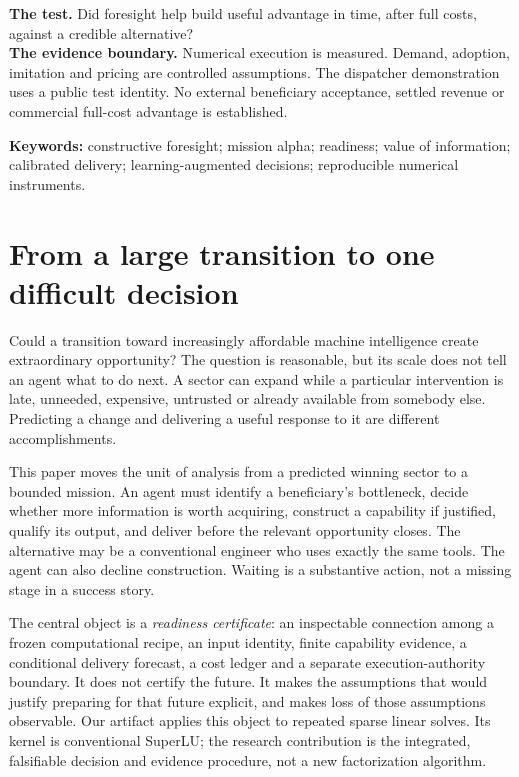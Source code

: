 \documentclass[11pt,a4paper]{article}
\begin{document}
\begin{claimbox}
\textbf{The test.} Did foresight help build useful advantage in time, after full costs, against a credible alternative?\\[3pt]
\textbf{The evidence boundary.} Numerical execution is measured. Demand, adoption, imitation and pricing are controlled assumptions. The dispatcher demonstration uses a public test identity. No external beneficiary acceptance, settled revenue or commercial full-cost advantage is established.
\end{claimbox}
\vspace{2mm}
\textbf{Keywords:} constructive foresight; mission alpha; readiness; value of information; calibrated delivery; learning-augmented decisions; reproducible numerical instruments.

\section{From a large transition to one difficult decision}
Could a transition toward increasingly affordable machine intelligence create extraordinary opportunity? The question is reasonable, but its scale does not tell an agent what to do next. A sector can expand while a particular intervention is late, unneeded, expensive, untrusted or already available from somebody else. Predicting a change and delivering a useful response to it are different accomplishments.

This paper moves the unit of analysis from a predicted winning sector to a bounded mission. An agent must identify a beneficiary's bottleneck, decide whether more information is worth acquiring, construct a capability if justified, qualify its output, and deliver before the relevant opportunity closes. The alternative may be a conventional engineer who uses exactly the same tools. The agent can also decline construction. Waiting is a substantive action, not a missing stage in a success story.

The central object is a \emph{readiness certificate}: an inspectable connection among a frozen computational recipe, an input identity, finite capability evidence, a conditional delivery forecast, a cost ledger and a separate execution-authority boundary. It does not certify the future. It makes the assumptions that would justify preparing for that future explicit, and makes loss of those assumptions observable. Our artifact applies this object to repeated sparse linear solves. Its kernel is conventional SuperLU; the research contribution is the integrated, falsifiable decision and evidence procedure, not a new factorization algorithm.
\end{document}
